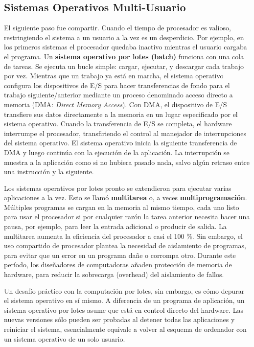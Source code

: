 \documentclass[10pt]{book}
\begin{document}
\subsection{Sistemas Operativos Multi-Usuario}
El siguiente paso fue compartir. Cuando el tiempo de procesador es valioso, restringiendo el sistema a un usuario a la vez es un desperdicio. Por ejemplo, en los primeros sistemas el procesador quedaba inactivo mientras el usuario cargaba el programa. Un \textbf{sistema operativo por lotes (batch)} funciona con una cola de tareas. Se ejecuta un bucle simple: cargar, ejecutar, y descargar cada trabajo por vez. Mientras que un trabajo ya está en marcha, el sistema operativo configura los dispositivos de E/S para hacer transferencias de fondo para el trabajo siguiente/anterior mediante un proceso denominado acceso directo a memoria (DMA: \textit{Direct Memory Access}). Con DMA, el dispositivo de E/S transfiere sus datos directamente a la memoria en un lugar especificado por el sistema operativo. Cuando la transferencia de E/S se completa, el hardware interrumpe el procesador, transfiriendo el control al manejador de interrupciones del sistema operativo. El sistema operativo inicia la siguiente transferencia de DMA y luego continúa con la ejecución de la aplicación. La interrupción se muestra a la aplicación como si no hubiera pasado nada, salvo algún retraso entre una instrucción y la siguiente.

Los sistemas operativos por lotes pronto se extendieron para ejecutar varias aplicaciones a la vez. Esto se llamó \textbf{multitarea} o, a veces \textbf{multiprogramación}. Múltiples programas se cargan en la memoria al mismo tiempo, cada uno listo para usar el procesador si por cualquier razón la tarea anterior necesita hacer una pausa, por ejemplo, para leer la entrada adicional o producir de salida. La multitarea aumenta la eficiencia del procesador a casi el 100 \%. Sin embargo, el uso compartido de procesador plantea la necesidad de aislamiento de programas, para evitar que un error en un programa dañe o corrompa otro. Durante este período, los diseñadores de computadoras añaden protección de memoria de hardware, para reducir la sobrecarga (overhead) del aislamiento de fallos.

Un desafío práctico con la computación por lotes, sin embargo, es cómo depurar el sistema operativo en sí mismo. A diferencia de un programa de aplicación, un sistema operativo por lotes asume que está en control directo del hardware. Las nuevas versiones sólo pueden ser probadas al detener todas las aplicaciones y reiniciar el sistema, esencialmente equivale a volver al esquema de ordenador con un sistema operativo de un solo usuario.
\end{document}
